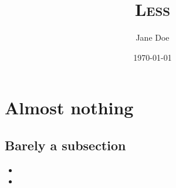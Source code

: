 \documentclass{article}
\title{\textsc{Less}\vspace{-2ex}}
\author{\normalsize Jane Doe\vspace{-2ex}}
\date{\normalsize\today}
\begin{document}
\maketitle

\section*{Almost nothing}
\lipsum[5][3-5]
\subsection*{Barely a subsection}
\lipsum[4]

\begin{itemize}
  \item \lipsum[5][1]
  \item \lipsum[5][2]
\end{itemize}
\end{document}
